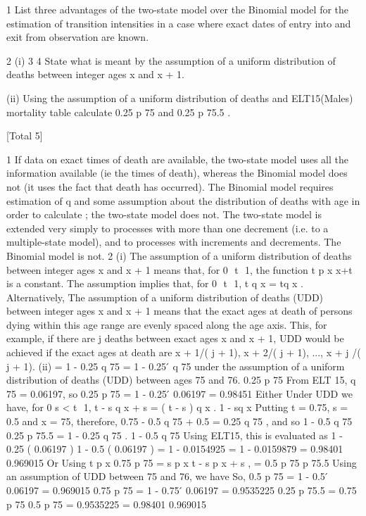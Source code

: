 \documentclass[a4paper,12pt]{article}
\begin{document}
1 List three advantages of the two-state model over the Binomial model for the
estimation of transition intensities in a case where exact dates of entry into and exit
from observation are known.

2 (i)
3
4
State what is meant by the assumption of a uniform distribution of deaths
between integer ages x and x + 1.

(ii) Using the assumption of a uniform distribution of deaths and ELT15(Males)
mortality table calculate 0.25 p 75 and 0.25 p 75.5 .

[Total 5]


1
If data on exact times of death are available, the two-state model uses all the
information available (ie the times of death), whereas the Binomial model does not (it
uses the fact that death has occurred).
The Binomial model requires estimation of q and some assumption about the
distribution of deaths with age in order to calculate \mu; the two-state model does not.
The two-state model is extended very simply to processes with more than one
decrement (i.e. to a multiple-state model), and to processes with increments and
decrements. The Binomial model is not.
2
(i)
The assumption of a uniform distribution of deaths between integer ages x and
x + 1 means that, for 0  t  1, the function t p x \mu x+t is a constant.
The assumption implies that, for 0  t  1, t q x = tq x .
Alternatively,
The assumption of a uniform distribution of deaths (UDD) between integer
ages x and x + 1 means that the exact ages at death of persons dying within
this age range are evenly spaced along the age axis.
This, for example, if there are j deaths between exact ages x and x + 1, UDD
would be achieved if the exact ages at death are x + 1/( j + 1), x + 2/( j + 1), ...,
x + j /( j + 1).
(ii)
= 1 - 0.25 q 75 = 1 - 0.25  ́ q 75 under the assumption of a uniform
distribution of deaths (UDD) between ages 75 and 76.
0.25 p 75
From ELT 15, q 75 = 0.06197, so
0.25 p 75
= 1 - 0.25  ́ 0.06197 = 0.98451
Either
Under UDD we have, for 0  s < t  1,
t - s q x + s
=
( t - s ) q x
.
1 - sq x
Putting t = 0.75, s = 0.5 and x = 75, therefore,
0.75 - 0.5 q 75 + 0.5
=
0.25 q 75
, and so
1 - 0.5 q 75
0.25 p 75.5
= 1 -
0.25 q 75
.
1 - 0.5 q 75
Using ELT15, this is evaluated as
1 -
0.25 ( 0.06197 )
1 - 0.5 ( 0.06197 )
= 1 -
0.0154925
= 1 - 0.0159879 = 0.98401
0.969015
Or
Using t p x
0.75 p 75
= s p x \int t - s p x + s ,
=
0.5 p 75  p 75.5
Using an assumption of UDD between 75 and 76, we have
So,
0.5 p 75 = 1 - 0.5  ́ 0.06197 = 0.969015
0.75 p 75 = 1 - 0.75  ́ 0.06197 = 0.9535225
0.25 p 75.5 =
0.75 p 75
0.5 p 75
=
0.9535225
= 0.98401
0.969015
\end{document}
